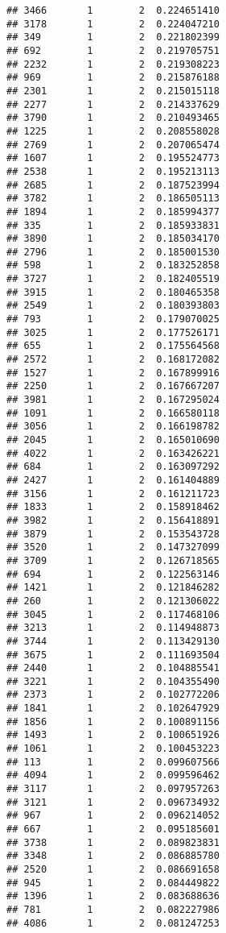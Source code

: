 \documentclass[
]{article}
\begin{document}
\begin{verbatim}
## 3466       1        2  0.224651410
## 3178       1        2  0.224047210
## 349        1        2  0.221802399
## 692        1        2  0.219705751
## 2232       1        2  0.219308223
## 969        1        2  0.215876188
## 2301       1        2  0.215015118
## 2277       1        2  0.214337629
## 3790       1        2  0.210493465
## 1225       1        2  0.208558028
## 2769       1        2  0.207065474
## 1607       1        2  0.195524773
## 2538       1        2  0.195213113
## 2685       1        2  0.187523994
## 3782       1        2  0.186505113
## 1894       1        2  0.185994377
## 335        1        2  0.185933831
## 3890       1        2  0.185034170
## 2796       1        2  0.185001530
## 598        1        2  0.183252858
## 3727       1        2  0.182405519
## 3915       1        2  0.180465358
## 2549       1        2  0.180393803
## 793        1        2  0.179070025
## 3025       1        2  0.177526171
## 655        1        2  0.175564568
## 2572       1        2  0.168172082
## 1527       1        2  0.167899916
## 2250       1        2  0.167667207
## 3981       1        2  0.167295024
## 1091       1        2  0.166580118
## 3056       1        2  0.166198782
## 2045       1        2  0.165010690
## 4022       1        2  0.163426221
## 684        1        2  0.163097292
## 2427       1        2  0.161404889
## 3156       1        2  0.161211723
## 1833       1        2  0.158918462
## 3982       1        2  0.156418891
## 3879       1        2  0.153543728
## 3520       1        2  0.147327099
## 3709       1        2  0.126718565
## 694        1        2  0.122563146
## 1421       1        2  0.121846282
## 260        1        2  0.121306022
## 3045       1        2  0.117468106
## 3213       1        2  0.114948873
## 3744       1        2  0.113429130
## 3675       1        2  0.111693504
## 2440       1        2  0.104885541
## 3221       1        2  0.104355490
## 2373       1        2  0.102772206
## 1841       1        2  0.102647929
## 1856       1        2  0.100891156
## 1493       1        2  0.100651926
## 1061       1        2  0.100453223
## 113        1        2  0.099607566
## 4094       1        2  0.099596462
## 3117       1        2  0.097957263
## 3121       1        2  0.096734932
## 967        1        2  0.096214052
## 667        1        2  0.095185601
## 3738       1        2  0.089823831
## 3348       1        2  0.086885780
## 2520       1        2  0.086691658
## 945        1        2  0.084449822
## 1396       1        2  0.083688636
## 781        1        2  0.082227986
## 4086       1        2  0.081247253

\end{verbatim}
\end{document}
